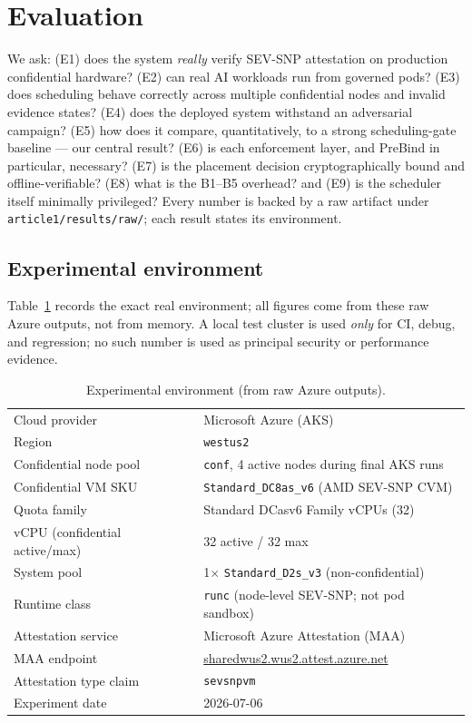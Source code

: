 \section{Evaluation}
\label{sec:evaluation}

We ask: (E1) does the system \emph{really} verify SEV-SNP attestation on
production confidential hardware? (E2) can real AI workloads run from governed
pods? (E3) does scheduling behave correctly across multiple confidential nodes
and invalid evidence states? (E4) does the deployed system withstand an
adversarial campaign? (E5) how does it compare, quantitatively, to a strong
scheduling-gate baseline --- our central result? (E6) is each enforcement layer,
and PreBind in particular, necessary? (E7) is the placement decision
cryptographically bound and offline-verifiable? (E8) what is the B1--B5 overhead?
and (E9) is the scheduler itself minimally privileged? Every number is backed by
a raw artifact under \texttt{article1/results/raw/}; each result states its
environment.

\subsection{Experimental environment}
Table~\ref{tab:env} records the exact real environment; all figures come from
these raw Azure outputs, not from memory. A local test cluster is used
\emph{only} for CI, debug, and regression; no such number is used as
principal security or performance evidence.

\begin{table}[t]
  \centering
  \caption{Experimental environment (from raw Azure outputs).}
  \label{tab:env}
  \footnotesize
  \begin{tabular}{@{}lp{4.9cm}@{}}
    \toprule
    Cloud provider & Microsoft Azure (AKS) \\
    Region & \texttt{westus2} \\
    Confidential node pool & \texttt{conf}, 4 active nodes during final AKS runs \\
    Confidential VM SKU & \texttt{Standard\_DC8as\_v6} (AMD SEV-SNP CVM) \\
    Quota family & Standard DCasv6 Family vCPUs (32) \\
    vCPU (confidential active/max) & 32 active / 32 max \\
    System pool & 1$\times$ \texttt{Standard\_D2s\_v3} (non-confidential) \\
    Runtime class & \texttt{runc} (node-level SEV-SNP; not pod sandbox) \\
    Attestation service & Microsoft Azure Attestation (MAA) \\
    MAA endpoint & \url{sharedwus2.wus2.attest.azure.net} \\
    Attestation type claim & \texttt{sevsnpvm} \\
    Experiment date & 2026-07-06 \\
    \bottomrule
  \end{tabular}
\end{table}

